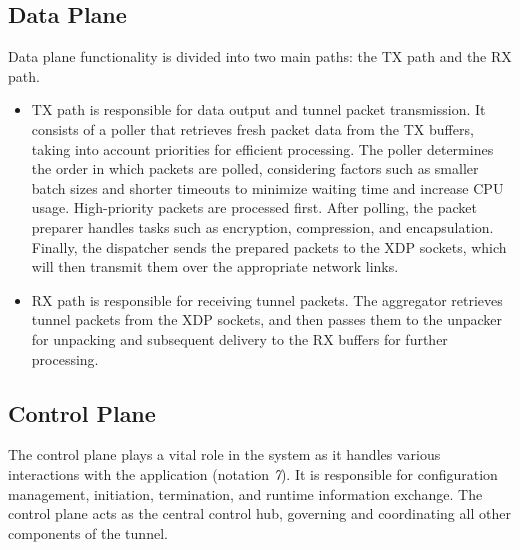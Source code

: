 \subsection{Data Plane}
Data plane functionality is divided into two main paths: the TX path and the RX path.
\begin{itemize}
	\item TX path is responsible for data output and tunnel packet transmission. It consists of a poller that retrieves fresh packet data from the TX buffers, taking into account priorities for efficient processing. The poller determines the order in which packets are polled, considering factors such as smaller batch sizes and shorter timeouts to minimize waiting time and increase CPU usage. High-priority packets are processed first. After polling, the packet preparer handles tasks such as encryption, compression, and encapsulation. Finally, the dispatcher sends the prepared packets to the XDP sockets, which will then transmit them over the appropriate network links.
	\item RX path is responsible for receiving tunnel packets. The aggregator retrieves tunnel packets from the XDP sockets, and then passes them to the unpacker for unpacking and subsequent delivery to the RX buffers for further processing.
\end{itemize}

\subsection{Control Plane}
The control plane plays a vital role in the system as it handles various interactions with the application (notation \textit{7}). 
It is responsible for configuration management, initiation, termination, and runtime information exchange. 
The control plane acts as the central control hub, governing and coordinating all other components of the tunnel.

% 

